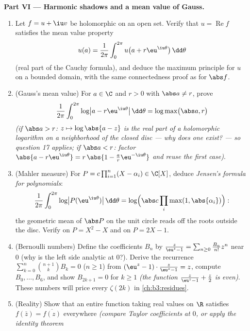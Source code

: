 \begin{problem}
\medskip
\noindent\textbf{Part VI --- Harmonic shadows and a mean
value of Gauss.}
\begin{enumerate}[resume]
  \item Let $f = u + \iu v$ be holomorphic on an open set.
        Verify that $u = \operatorname{Re}f$ satisfies the
        mean value property
        \[
        u(a) = \frac1{2\pi}\int_0^{2\pi}
        u\bigl(a + r\eu^{\iu\theta}\bigr)\,\dd\theta
        \]
        (real part of the Cauchy formula), and deduce the
        maximum principle for $u$ on a bounded domain, with
        the same connectedness proof as for $\abs f$.
  \item (Gauss's mean value) For $a \in \C$ and $r > 0$ with
        $\abs a \neq r$, prove
        \[
        \frac1{2\pi}\int_0^{2\pi}
        \log\bigl|a - r\eu^{\iu\theta}\bigr|\,\dd\theta
        = \log\max\bigl(\abs a, r\bigr)
        \]
        \emph{(if $\abs a > r$: $z \mapsto \log\abs{a - z}$
        is the real part of a holomorphic logarithm on a
        neighborhood of the closed disc --- why does one
        exist? --- so question 17 applies; if $\abs a < r$:
        factor $\abs{a - r\eu^{\iu\theta}} = r\,\abs{1 -
        \frac ar\eu^{-\iu\theta}}$ and reuse the first
        case)}.
  \item (Mahler measure) For $P = c\prod_{i=1}^n(X -
        \alpha_i) \in \C[X]$, deduce \emph{Jensen's formula
        for polynomials}:
        \[
        \frac1{2\pi}\int_0^{2\pi}\log\bigl|P(\eu^{\iu\theta})
        \bigr|\,\dd\theta
        = \log\Bigl(\abs c\prod_{i}\max(1,
        \abs{\alpha_i})\Bigr) :
        \]
        the geometric mean of $\abs P$ on the unit circle
        reads off the roots outside the disc. Verify on $P =
        X^2 - X$ and on $P = 2X - 1$.
  \item (Bernoulli numbers) Define the coefficients $B_n$ by
        $\frac{z}{\eu^z - 1} = \sum_{n\geq0}\frac{B_n}{n!}
        z^n$ near $0$ (why is the left side analytic at
        $0$?). Derive the recurrence
        $\sum_{k=0}^{n}\binom{n+1}kB_k = 0$ ($n \geq 1$) from
        $(\eu^z - 1)\cdot\frac z{\eu^z-1} = z$, compute $B_0,
        \dots, B_6$, and show $B_{2k+1} = 0$ for $k \geq 1$
        \emph{(the function $\frac z{\eu^z-1} + \frac z2$ is
        even)}. These numbers will price every $\zeta(2k)$ in
        \cref{ch:b3:residues}.
  \item (Reality) Show that an entire function taking real
        values on $\R$ satisfies $f(\bar z) =
        \overline{f(z)}$ everywhere \emph{(compare Taylor
        coefficients at $0$, or apply the identity theorem
}
\end{enumerate}
\end{problem}
